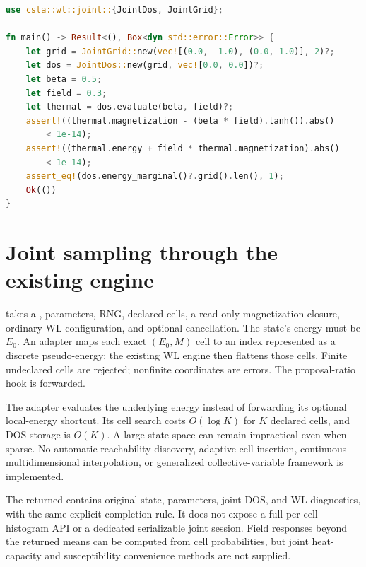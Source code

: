 \documentclass[11pt,a4paper,oneside]{report}
\newcommand{\api}[1]{\texttt{\detokenize{#1}}}
\begin{document}
\par\noindent\begin{minipage}{\linewidth}
\begin{lstlisting}[language=Rust,caption={An exact one-spin joint spectrum and field response.}]
use csta::wl::joint::{JointDos, JointGrid};

fn main() -> Result<(), Box<dyn std::error::Error>> {
    let grid = JointGrid::new(vec![(0.0, -1.0), (0.0, 1.0)], 2)?;
    let dos = JointDos::new(grid, vec![0.0, 0.0])?;
    let beta = 0.5;
    let field = 0.3;
    let thermal = dos.evaluate(beta, field)?;
    assert!((thermal.magnetization - (beta * field).tanh()).abs()
        < 1e-14);
    assert!((thermal.energy + field * thermal.magnetization).abs()
        < 1e-14);
    assert_eq!(dos.energy_marginal()?.grid().len(), 1);
    Ok(())
}
\end{lstlisting}
\end{minipage}\par

\section{Joint sampling through the existing engine}
\api{run_joint} takes a \api{State}, parameters, RNG, declared cells, a read-only
magnetization closure, ordinary WL configuration, and optional cancellation.
The state's energy must be $E_0$. An adapter maps each exact $(E_0,M)$ cell to an
index represented as a discrete pseudo-energy; the existing WL engine then
flattens those cells. Finite undeclared cells are rejected; nonfinite coordinates
are errors. The proposal-ratio hook is forwarded.

The adapter evaluates the underlying energy instead of forwarding its optional
local-energy shortcut. Its cell search costs $O(\log K)$ for $K$ declared cells,
and DOS storage is $O(K)$. A large state space can remain impractical even when
sparse. No automatic reachability discovery, adaptive cell insertion, continuous
multidimensional interpolation, or generalized collective-variable framework is
implemented.

The returned \api{JointRun} contains original state, parameters, joint DOS, and
WL diagnostics, with the same explicit completion rule. It does not expose a
full per-cell histogram API or a dedicated serializable joint session. Field
responses beyond the returned means can be computed from cell probabilities,
but joint heat-capacity and susceptibility convenience methods are not supplied.
\end{document}
